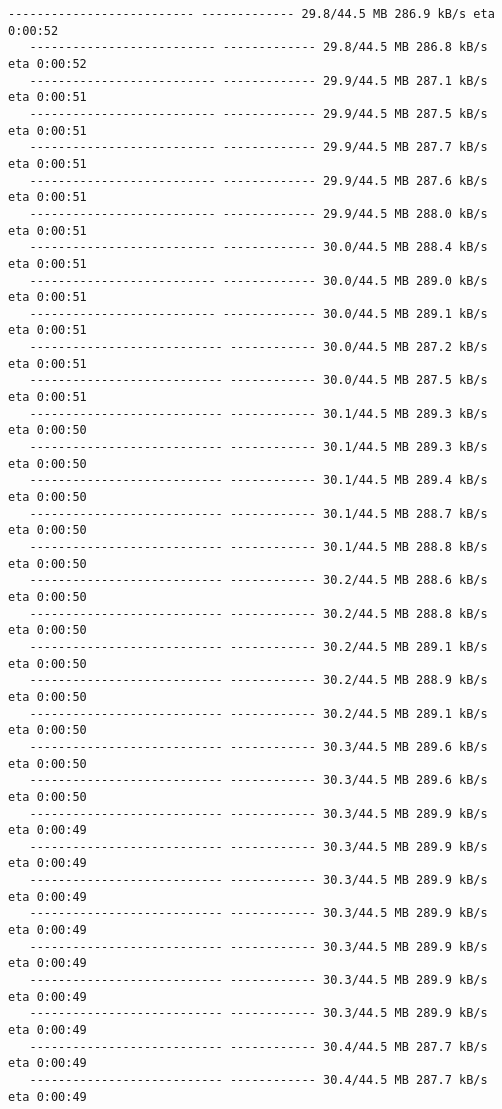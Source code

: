 \documentclass[11pt]{article}
\begin{document}
\begin{Verbatim}[commandchars=\\\{\}]
   -------------------------- ------------- 29.8/44.5 MB 286.9 kB/s eta 0:00:52
   -------------------------- ------------- 29.8/44.5 MB 286.8 kB/s eta 0:00:52
   -------------------------- ------------- 29.9/44.5 MB 287.1 kB/s eta 0:00:51
   -------------------------- ------------- 29.9/44.5 MB 287.5 kB/s eta 0:00:51
   -------------------------- ------------- 29.9/44.5 MB 287.7 kB/s eta 0:00:51
   -------------------------- ------------- 29.9/44.5 MB 287.6 kB/s eta 0:00:51
   -------------------------- ------------- 29.9/44.5 MB 288.0 kB/s eta 0:00:51
   -------------------------- ------------- 30.0/44.5 MB 288.4 kB/s eta 0:00:51
   -------------------------- ------------- 30.0/44.5 MB 289.0 kB/s eta 0:00:51
   -------------------------- ------------- 30.0/44.5 MB 289.1 kB/s eta 0:00:51
   --------------------------- ------------ 30.0/44.5 MB 287.2 kB/s eta 0:00:51
   --------------------------- ------------ 30.0/44.5 MB 287.5 kB/s eta 0:00:51
   --------------------------- ------------ 30.1/44.5 MB 289.3 kB/s eta 0:00:50
   --------------------------- ------------ 30.1/44.5 MB 289.3 kB/s eta 0:00:50
   --------------------------- ------------ 30.1/44.5 MB 289.4 kB/s eta 0:00:50
   --------------------------- ------------ 30.1/44.5 MB 288.7 kB/s eta 0:00:50
   --------------------------- ------------ 30.1/44.5 MB 288.8 kB/s eta 0:00:50
   --------------------------- ------------ 30.2/44.5 MB 288.6 kB/s eta 0:00:50
   --------------------------- ------------ 30.2/44.5 MB 288.8 kB/s eta 0:00:50
   --------------------------- ------------ 30.2/44.5 MB 289.1 kB/s eta 0:00:50
   --------------------------- ------------ 30.2/44.5 MB 288.9 kB/s eta 0:00:50
   --------------------------- ------------ 30.2/44.5 MB 289.1 kB/s eta 0:00:50
   --------------------------- ------------ 30.3/44.5 MB 289.6 kB/s eta 0:00:50
   --------------------------- ------------ 30.3/44.5 MB 289.6 kB/s eta 0:00:50
   --------------------------- ------------ 30.3/44.5 MB 289.9 kB/s eta 0:00:49
   --------------------------- ------------ 30.3/44.5 MB 289.9 kB/s eta 0:00:49
   --------------------------- ------------ 30.3/44.5 MB 289.9 kB/s eta 0:00:49
   --------------------------- ------------ 30.3/44.5 MB 289.9 kB/s eta 0:00:49
   --------------------------- ------------ 30.3/44.5 MB 289.9 kB/s eta 0:00:49
   --------------------------- ------------ 30.3/44.5 MB 289.9 kB/s eta 0:00:49
   --------------------------- ------------ 30.3/44.5 MB 289.9 kB/s eta 0:00:49
   --------------------------- ------------ 30.4/44.5 MB 287.7 kB/s eta 0:00:49
   --------------------------- ------------ 30.4/44.5 MB 287.7 kB/s eta 0:00:49

\end{Verbatim}
\end{document}
